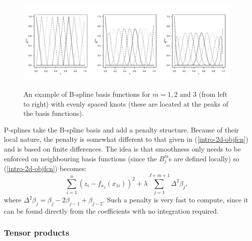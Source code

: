 \begin{figure}[tb]
\centering
\includegraphics[width=6in]{intro/figs/bspline-ex.pdf}\\
\caption{An example of B-spline basis functions for $m=1, 2$ and $3$ (from left to right) with evenly spaced knots (these are located at the peaks of the basis functions).}
\label{bs-basis}
\end{figure}

P-splines take the B-spline basis and add a penalty structure. Because of their local nature, the penalty is somewhat different to that given in (\ref{intro-2d-objfcn}) and is based on finite differences. The idea is that smoothness only needs to be enforced on neighbouring basis functions (since the $B^m_j$s are defined locally) so (\ref{intro-2d-objfcn}) becomes:
\begin{equation*}
\sum_{i=1}^n (z_i - f_{x_1}(x_{1i}))^2 +  \lambda \sum_{j=1}^{J+m+1} \Delta^2 \beta_j,
\end{equation*}
where $\Delta^2 \beta_j = \beta_j -2\beta_{j-1} + \beta_{j-2}$. Such a penalty is very fast to compute, since it can be found directly from the coefficients with no integration required.

\subsubsection{Tensor products}

